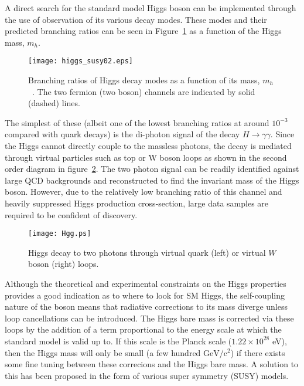 \documentclass[a4paper,10pt]{article}
\begin{document}
A direct search for the standard model Higgs boson can be implemented through the use of observation of its various decay modes. These modes and their predicted branching ratios can be seen in
Figure~\ref{fig:hggmodes} as a function of the Higgs mass, $m_h$. 

\begin{figure}[hbt!]
 			\centering
 			\texttt{[image: higgs\_susy02.eps]}
 			\caption{Branching ratios of Higgs decay modes as a function of its mass, $m_h$~\cite{haber-2002}. The two fermion (two boson) channels are indicated by solid (dashed) lines. }
   \label{fig:hggmodes}
\end{figure}

The simplest of these (albeit one of the lowest branching ratios at around $10^{-3}$ compared with quark decays) is the
di-photon signal of the decay $H \rightarrow \gamma \gamma$. Since the Higgs cannot directly couple to the massless photons, the decay is mediated through virtual particles such as top or W boson loops as
shown in the second order diagram in figure~\ref{fig:higgsdecay}. The two photon signal can be readily identified against large QCD backgrounds 
and reconstructed to find the invariant mass of the Higgs boson. However, due to the relatively low branching ratio of this channel and heavily suppressed Higgs production cross-section, 
large data samples are required to be confident of discovery.

\begin{figure}[hbt!]
 			\centering
 			\texttt{[image: Hgg.ps]}
 			\caption{Higgs decay to two photons through virtual quark (left) or virtual $W$ boson (right) loops.}
   \label{fig:higgsdecay}
\end{figure}

Although the theoretical and experimental constraints on the Higgs properties provides a good indication as to where to look for SM Higgs, the self-coupling nature of the boson
means that radiative corrections to its mass diverge unless loop 
cancellations can be introduced. The Higgs bare mass is corrected via these loops by the addition of a term proportional to the energy scale at which the standard model is valid up to. If this scale is the
Planck scale ($1.22 \times 10^{28}$ eV), then the Higgs mass will only be small (a few hundred $\mathrm{GeV/c^2}$) if there exists some fine tuning between these correcions and the Higgs bare mass.
A solution to this has been proposed in the form of various super symmetry (SUSY) models. 
\end{document}
